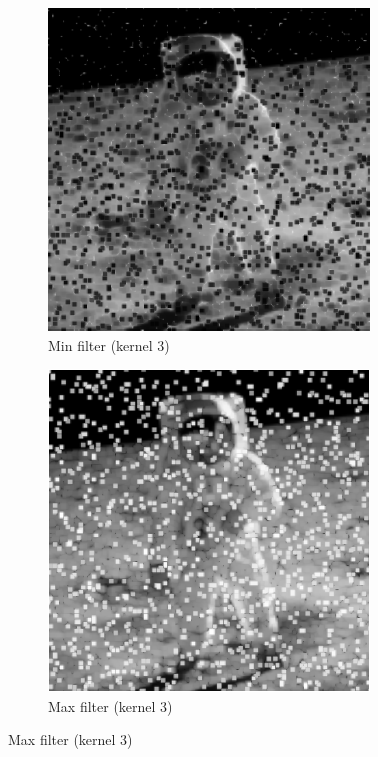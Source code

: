 \documentclass{article}
\begin{document}
\begin{figure}[H]
	\begin{subfigure}{0.4\textwidth}
		\includegraphics[width=\textwidth]{Generated/Astronaut_salt_pepper_min3filter.png}
		\caption{Min filter (kernel 3)}
	\end{subfigure}
	\hfill
	\begin{subfigure}{0.4\textwidth}
		\includegraphics[width=\textwidth]{Generated/Astronaut_salt_pepper_max3filter.png}
		\caption{Max filter (kernel 3)}
	\end{subfigure}


\end{figure}
\end{document}

